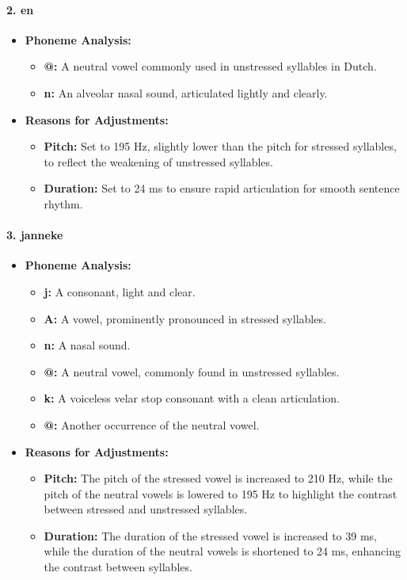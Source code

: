 \documentclass{../labbook}
\begin{document}
\begin{solution}
\paragraph{2. en}
\begin{itemize}
    \item \textbf{Phoneme Analysis:}
        \begin{itemize}
            \item \textbf{@:} A neutral vowel commonly used in unstressed syllables in Dutch.
            \item \textbf{n:} An alveolar nasal sound, articulated lightly and clearly.
        \end{itemize}
    \item \textbf{Reasons for Adjustments:}
        \begin{itemize}
            \item \textbf{Pitch:} Set to 195 Hz, slightly lower than the pitch for stressed syllables, to reflect the weakening of unstressed syllables.
            \item \textbf{Duration:} Set to 24 ms to ensure rapid articulation for smooth sentence rhythm.
        \end{itemize}
\end{itemize}

\paragraph{3. janneke}
\begin{itemize}
    \item \textbf{Phoneme Analysis:}
        \begin{itemize}
            \item \textbf{j:} A consonant, light and clear.
            \item \textbf{A:} A vowel, prominently pronounced in stressed syllables.
            \item \textbf{n:} A nasal sound.
            \item \textbf{@:} A neutral vowel, commonly found in unstressed syllables.
            \item \textbf{k:} A voiceless velar stop consonant with a clean articulation.
            \item \textbf{@:} Another occurrence of the neutral vowel.
        \end{itemize}
    \item \textbf{Reasons for Adjustments:}
        \begin{itemize}
            \item \textbf{Pitch:} The pitch of the stressed vowel is increased to 210 Hz, while the pitch of the neutral vowels is lowered to 195 Hz to highlight the contrast between stressed and unstressed syllables.
            \item \textbf{Duration:} The duration of the stressed vowel is increased to 39 ms, while the duration of the neutral vowels is shortened to 24 ms, enhancing the contrast between syllables.
        \end{itemize}
\end{itemize}


\end{solution}
\end{document}
